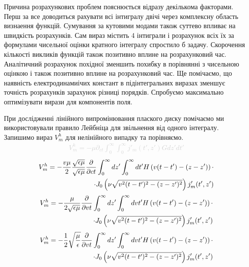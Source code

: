 Причина розрахункових проблем пояснюється відразу декількома факторами.
Перш за все доводиться рахувати всі інтигралу двічі через комплексну область 
визнаення функцій. Сумування за кутовими модами також суттево впливає на 
швидкість розрахунків. Сам вираз містить 4 інтиграли і розрахунок всіх їх за 
формулами чисельної оцінки кратного інтегралу спростило б задачу. Скорочення 
кількості викликів функцій також позитивно вплине на розрахунковий час. 
Аналітичний розрахунок похідної зменшить похибку в порівнянні з чисельною 
оцінкою і також позитивно вплине на розрахунковий час. Ще помічаємо, що 
наявність електродинамиічих констант в підінтегральних виразах зменшує точність 
розрахунків зарахунок різниці порядків. Спробуємо максимально оптимізувати 
вирази для компонентів поля.

При дослідженні лінійного випромінювання плаского диску помічаємо ми 
використовували правило Лейбніца для звільнення від одного інтегралу.
Запишимо вираз $ V_m^h $ для нелінійного випадку та порівняємо.
%
\textcolor{lightgray} { \begin{equation*} \begin{aligned} 
V_m^h = - \mu \partial_{ct} \int_0^\infty \int_0^\infty j'_m (t',z') G dz' dt'
\end{aligned} \end{equation*} }
%
\textcolor{lightgray} { \begin{equation*} \begin{aligned} 
V_m^h = - \frac{v \mu}{2} \frac{\sqrt{\epsilon \mu}}{\sqrt{\epsilon \mu}} 
\frac{\partial }{\partial ct} \int_0^\infty dz' \int_0^\infty 
dt' H \left( v (t-t') - (z-z') \right) \cdot \\
\cdot J_0 \left( \nu \sqrt{v^2 (t-t')^2 - (z-z')^2} \right) j'_m (t',z')
\end{aligned} \end{equation*} }
%
\textcolor{lightgray} { \begin{equation*} \begin{aligned} 
V_m^h = - \frac{\mu}{2 \sqrt{\epsilon \mu}} \frac{\partial }{\partial vt} 
\int_0^\infty dz' \int_0^\infty dvt' 
H \left( v (t-t') - (z-z') \right) \cdot \\
\cdot J_0 \left( \nu \sqrt{v^2 (t-t')^2 - (z-z')^2} \right) j'_m (t',z')
\end{aligned} \end{equation*} }
%
\textcolor{lightgray} { \begin{equation*} \begin{aligned} 
V_m^h = - \frac{1}{2} \sqrt{\frac{\mu}{\epsilon}} \frac{\partial }{\partial vt} 
\int_0^\infty dz' \int_0^\infty dvt' 
H \left( v (t-t') - (z-z') \right) \cdot \\
\cdot J_0 \left( \nu \sqrt{v^2 (t-t')^2 - (z-z')^2} \right) j'_m (t',z')
\end{aligned} \end{equation*} }
